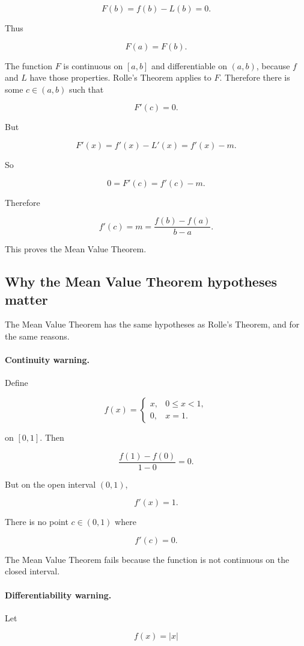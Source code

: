 \[
F(b)=f(b)-L(b)=0.
\]

Thus

\[
F(a)=F(b).
\]

The function \(F\) is continuous on \([a,b]\) and differentiable on \((a,b)\), because
\(f\) and \(L\) have those properties.  Rolle's Theorem applies to \(F\).  Therefore
there is some \(c\in(a,b)\) such that

\[
F'(c)=0.
\]

But

\[
F'(x)=f'(x)-L'(x)=f'(x)-m.
\]

So

\[
0=F'(c)=f'(c)-m.
\]

Therefore

\[
f'(c)=m=\frac{f(b)-f(a)}{b-a}.
\]

This proves the Mean Value Theorem.

\subsection{Why the Mean Value Theorem hypotheses matter}
\label{subsec:mvt-hypotheses-matter}

The Mean Value Theorem has the same hypotheses as Rolle's Theorem, and for the
same reasons.

\paragraph{Continuity warning.}
Define

\[
f(x)=
\begin{cases}
x, & 0\le x<1,\\
0, & x=1.
\end{cases}
\]

on \([0,1]\).  Then

\[
\frac{f(1)-f(0)}{1-0}=0.
\]

But on the open interval \((0,1)\),

\[
f'(x)=1.
\]

There is no point \(c\in(0,1)\) where

\[
f'(c)=0.
\]

The Mean Value Theorem fails because the function is not continuous on the closed
interval.

\paragraph{Differentiability warning.}
Let

\[
f(x)=|x|
\]

